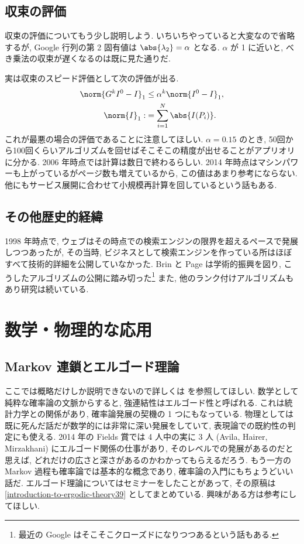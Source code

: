 \documentclass[openany, a4paper, oneside]{jsbook}
\begin{document}
\subsection{収束の評価}

収束の評価についてもう少し説明しよう.
いちいちやっていると大変なので省略するが,
Google 行列の第 2 固有値は $\abs{\lambda_2} = \alpha$ となる.
$\alpha$ が 1 に近いと, べき乗法の収束が遅くなるのは既に見た通りだ.

実は収束のスピード評価として次の評価が出る.
\begin{align}
 \norm{ G^k I^0 - I }_1
 &\le
 \alpha^k \norm{I^0 - I}_1, \\
 \norm{I}_1
 :&=
 \sum_{i=1}^N \abs{I(P_i)}.
\end{align}
これが最悪の場合の評価であることに注意してほしい.
$\alpha=0.15$ のとき,
50回から100回くらいアルゴリズムを回せばそこそこの精度が出せることがアプリオリに分かる.
2006 年時点では計算は数日で終わるらしい.
2014 年時点はマシンパワーも上がっているがページ数も増えているから,
この値はあまり参考にならない.
他にもサービス展開に合わせて小規模再計算を回しているという話もある.
\subsection{その他歴史的経緯}

1998 年時点で, ウェブはその時点での検索エンジンの限界を超えるペースで発展しつつあったが,
その当時, ビジネスとして検索エンジンを作っている所はほぼすべて技術的詳細を公開していなかった.
Brin と Page は学術的振興を図り, こうしたアルゴリズムの公開に踏み切った\footnote{最近の Google はそこそこクローズドになりつつあるという話もある.}
また, 他のランク付けアルゴリズムもあり研究は続いている.
\section{数学・物理的な応用}

\subsection{Markov 連鎖とエルゴード理論}

ここでは概略だけしか説明できないので詳しくは \cite[7 節]{TadahisaFunaki1} を参照してほしい.
数学として純粋な確率論の文脈からすると, 強連結性はエルゴード性と呼ばれる.
これは統計力学との関係があり, 確率論発展の契機の 1 つにもなっている.
物理としては既に死んだ話だが数学的には非常に深い発展をしていて, 表現論での既約性の判定にも使える.
2014 年の Fields 賞では 4 人中の実に 3 人 (Avila, Hairer, Mirzakhani) にエルゴード関係の仕事があり,
そのレベルでの発展があるのだと思えば, どれだけの広さと深さがあるのかわかってもらえるだろう.
もう一方の Markov 過程も確率論では基本的な概念であり, 確率論の入門にもちょうどいい話だ.
エルゴード理論についてはセミナーをしたことがあって, その原稿は \ref{introduction-to-ergodic-theory39} としてまとめている.
興味がある方は参考にしてほしい.
\end{document}
